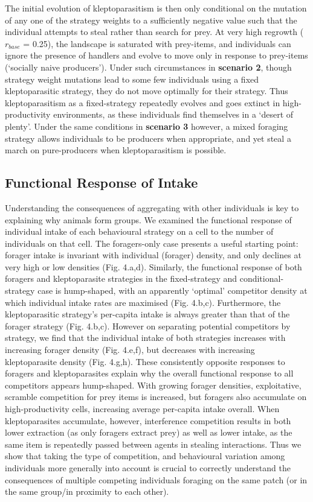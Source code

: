 \documentclass[11pt]{article}
\begin{document}
The initial evolution of kleptoparasitism is then only conditional on the mutation of any one of the strategy weights to a sufficiently negative value such that the individual attempts to steal rather than search for prey.
At very high regrowth ($r_{base}$ = 0.25), the landscape is saturated with prey-items, and individuals can ignore the presence of handlers and evolve to move only in response to prey-items (`socially naive producers').
Under such circumstances in \textbf{scenario 2}, though strategy weight mutations lead to some few individuals using a fixed kleptoparasitic strategy, they do not move optimally for their strategy.
Thus kleptoparasitism as a fixed-strategy repeatedly evolves and goes extinct in high-productivity environments, as these individuals find themselves in a `desert of plenty'.
Under the same conditions in \textbf{scenario 3} however, a mixed foraging strategy allows individuals to be producers when appropriate, and yet steal a march on pure-producers when kleptoparasitism is possible.

\subsection{Functional Response of Intake}

Understanding the consequences of aggregating with other individuals is key to explaining why animals form groups.
We examined the functional response of individual intake of each behavioural strategy on a cell to the number of individuals on that cell.
The foragers-only case presents a useful starting point: forager intake is invariant with individual (forager) density, and only declines at very high or low densities (Fig. 4.a,d).
Similarly, the functional response of both foragers and kleptoparasite strategies in the fixed-strategy and conditional-strategy case is hump-shaped, with an apparently `optimal' competitor density at which individual intake rates are maximised (Fig. 4.b,c).
Furthermore, the kleptoparasitic strategy's per-capita intake is always greater than that of the forager strategy (Fig. 4.b,c).
However on separating potential competitors by strategy, we find that the individual intake of both strategies increases with increasing forager density (Fig. 4.e,f), but decreases with increasing kleptoparasite density (Fig. 4.g,h).
These consistently opposite responses to foragers and kleptoparasites explain why the overall functional response to all competitors appears hump-shaped.
With growing forager densities, exploitative, scramble competition for prey items is increased, but foragers also accumulate on high-productivity cells, increasing average per-capita intake overall.
When kleptoparasites accumulate, however, interference competition results in both lower extraction (as only foragers extract prey) as well as lower intake, as the same item is repeatedly passed between agents in stealing interactions.
Thus we show that taking the type of competition, and behavioural variation among individuals more generally into account is crucial to correctly understand the consequences of multiple competing individuals foraging on the same patch (or in the same group/in proximity to each other).
\end{document}
